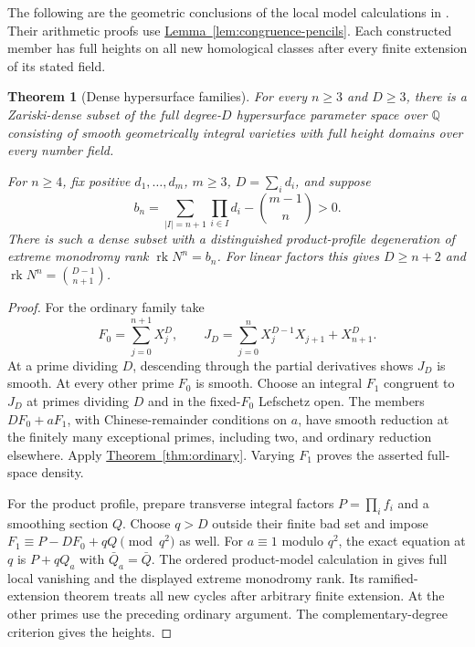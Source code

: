 \documentclass[11pt,a4paper]{article}
\newtheorem{theorem}{Theorem}[section]
\theoremstyle{definition}
\theoremstyle{remark}\newtheorem{remark}[theorem]{Remark}
\numberwithin{equation}{section}
\newcommand{\Q}{\mathbb Q}\newcommand{\R}{\mathbb R}\newcommand{\C}{\mathbb C}
\newcommand{\rk}{\operatorname{rk}}\newcommand{\im}{\operatorname{im}}
\newcommand{\thmref}[1]{\hyperref[#1]{\textcolor{resultlink}{Theorem~\ref*{#1}}}}
\newcommand{\lemref}[1]{\hyperref[#1]{\textcolor{resultlink}{Lemma~\ref*{#1}}}}
\begin{document}
The following are the geometric conclusions of the local model
calculations in \cite{InternalDense}. Their arithmetic proofs use
\lemref{lem:congruence-pencils}. Each constructed member has full
heights on all new homological classes after every finite extension
of its stated field.

\begin{theorem}[Dense hypersurface families]\label{thm:dense-hypersurfaces}
For every $n\geq3$ and $D\geq3$, there is a Zariski-dense subset
of the full degree-$D$ hypersurface parameter space over $\Q$
consisting of smooth geometrically integral varieties with full
height domains over every number field.

For $n\geq4$, fix positive $d_1,\ldots,d_m$, $m\geq3$,
$D=\sum_i d_i$, and suppose
\[
 b_n=\sum_{|I|=n+1}\prod_{i\in I}d_i-\binom{m-1}{n}>0.
\]
There is such a dense subset with a distinguished product-profile
degeneration of extreme monodromy rank $\rk N^n=b_n$. For linear
factors this gives $D\geq n+2$ and
$\rk N^n=\binom{D-1}{n+1}$.
\end{theorem}

\begin{proof}
For the ordinary family take
\[
 F_0=\sum_{j=0}^{n+1}X_j^D,\qquad
 J_D=\sum_{j=0}^n X_j^{D-1}X_{j+1}+X_{n+1}^D.
\]
At a prime dividing $D$, descending through the partial derivatives
shows $J_D$ is smooth. At every other prime $F_0$ is smooth.
Choose an integral $F_1$ congruent to $J_D$ at primes dividing
$D$ and in the fixed-$F_0$ Lefschetz open. The members
$DF_0+aF_1$, with Chinese-remainder conditions on $a$, have smooth
reduction at the finitely many exceptional primes, including two,
and ordinary reduction elsewhere. Apply \thmref{thm:ordinary}.
Varying $F_1$ proves the asserted full-space density.

For the product profile, prepare transverse integral factors
$P=\prod_i f_i$ and a smoothing section $Q$. Choose
$q>D$ outside their finite bad set and impose
$F_1\equiv P-DF_0+qQ\pmod{q^2}$ as well. For $a\equiv1$
modulo $q^2$, the exact equation at $q$ is $P+qQ_a$ with
$\bar Q_a=\bar Q$. The ordered product-model calculation in
\cite{InternalDense} gives full local vanishing and the displayed
extreme monodromy rank. Its ramified-extension theorem treats all
new cycles after arbitrary finite extension. At the other primes
use the preceding ordinary argument. The complementary-degree
criterion gives the heights.
\end{proof}
\end{document}
